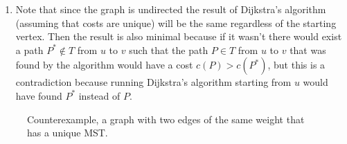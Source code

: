 \documentclass[10pt]{article}
\begin{document}
\begin{enumerate}
\begin{enumerate}[label=\roman*)]
              \item
                    Note that since the graph is undirected the result of Dijkstra's algorithm (assuming that costs are unique) will be the same regardless of the starting vertex.
                    Then the result is also minimal because if it wasn't there would exist a path $P^* \notin T$ from $u$ to $v$ such that the path $P \in T$ from $u$ to $v$ that was found by the algorithm would have a cost $c(P) > c(P^*)$, but this is a contradiction because running Dijkstra's algorithm starting from $u$ would have found $P^*$ instead of $P$.
          \end{enumerate}
\end{enumerate}

\begin{figure}[H]
    \centering


    \caption{Counterexample, a graph with two edges of the same weight that has a unique MST.}
    \label{fig:counterexample}
\end{figure}
\end{document}
